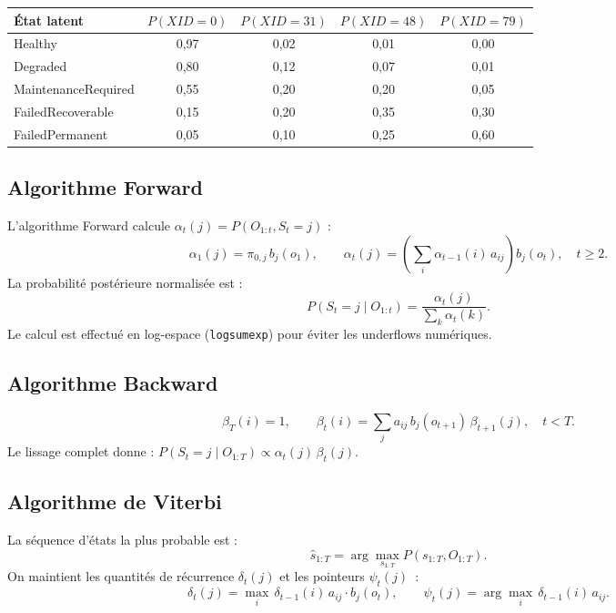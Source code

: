 \documentclass[12pt,a4paper]{article}
\begin{document}
\begin{center}
\begin{tabular}{lcccc}
\toprule
État latent & $P(XID=0)$ & $P(XID=31)$ & $P(XID=48)$ & $P(XID=79)$ \\
\midrule
Healthy              & 0,97 & 0,02 & 0,01 & 0,00 \\
Degraded             & 0,80 & 0,12 & 0,07 & 0,01 \\
MaintenanceRequired  & 0,55 & 0,20 & 0,20 & 0,05 \\
FailedRecoverable    & 0,15 & 0,20 & 0,35 & 0,30 \\
FailedPermanent      & 0,05 & 0,10 & 0,25 & 0,60 \\
\bottomrule
\end{tabular}
\end{center}

\subsection{Algorithme Forward}

L'algorithme Forward calcule $\alpha_t(j) = P(O_{1:t}, S_t=j)$ :
\[
\alpha_1(j) = \pi_{0,j}\,b_j(o_1),
\qquad
\alpha_t(j) = \left(\sum_i \alpha_{t-1}(i)\,a_{ij}\right) b_j(o_t),\quad t \geq 2.
\]
La probabilité postérieure normalisée est :
\[
P(S_t=j\mid O_{1:t}) = \frac{\alpha_t(j)}{\sum_k \alpha_t(k)}.
\]
Le calcul est effectué en log-espace (\texttt{logsumexp}) pour éviter les underflows numériques.

\subsection{Algorithme Backward}

\[
\beta_T(i) = 1,
\qquad
\beta_t(i) = \sum_j a_{ij}\,b_j(o_{t+1})\,\beta_{t+1}(j),\quad t < T.
\]
Le lissage complet donne : $P(S_t=j\mid O_{1:T}) \propto \alpha_t(j)\,\beta_t(j)$.

\subsection{Algorithme de Viterbi}

La séquence d'états la plus probable est :
\[
\hat{s}_{1:T} = \arg\max_{s_{1:T}} P(s_{1:T}, O_{1:T}).
\]
On maintient les quantités de récurrence $\delta_t(j)$ et les pointeurs $\psi_t(j)$~:
\[
\delta_t(j) = \max_{i}\, \delta_{t-1}(i)\,a_{ij}\cdot b_j(o_t),
\qquad
\psi_t(j) = \arg\max_{i}\, \delta_{t-1}(i)\,a_{ij}.
\]
\end{document}
